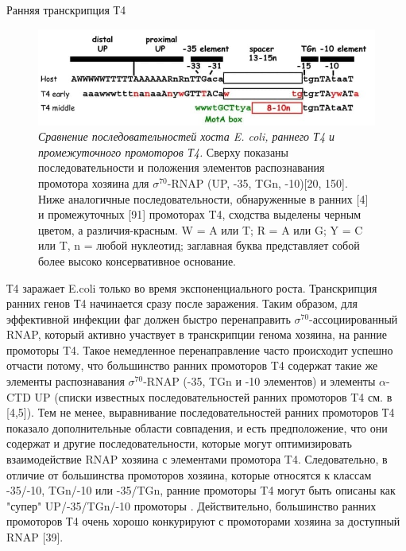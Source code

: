 \documentclass[14pt]{extarticle}
\begin{document}
        \begin{center}
            \item {\Large Ранняя транскрипция Т4}
        \end{center}
        
        \begin{figure}[h]
            \centering
                \includegraphics[width=\textwidth]{img/Hinton.jpg}
            \caption{\textit{Сравнение последовательностей хоста E. coli, раннего Т4 и промежуточного промоторов Т4.}
            Сверху показаны последовательности и положения элементов распознавания промотора хозяина для
            $\sigma^{70}$-RNAP (UP, -35, TGn, -10)[20, 150]. Ниже аналогичные последовательности, обнаруженные в ранних
            [4] и промежуточных [91] промоторах T4, сходства выделены черным цветом, а различия-красным. W = A или T; R
            = A или G; Y = C или T, n = любой нуклеотид; заглавная буква представляет собой более высоко консервативное
            основание. \cite{hinton}}
            \label{fig:skybox}
        \end{figure}

        \par{Т4 заражает E.coli только во время экспоненциального роста. Транскрипция ранних генов Т4 начинается сразу 
        после заражения. Таким образом, для эффективной инфекции фаг должен быстро перенаправить 
        \(\sigma^{70}\)-ассоциированный RNAP, который активно участвует в транскрипции генома хозяина, на ранние 
        промоторы T4. Такое немедленное перенаправление часто происходит успешно отчасти потому, что большинство ранних 
        промоторов T4 содержат такие же элементы распознавания \(\sigma^{70}\)-RNAP (-35, TGn и -10 элементов) и 
        элементы \(\alpha\)-CTD UP (списки известных последовательностей ранних промоторов T4 см. в [4,5]). Тем не
        менее, выравнивание последовательностей ранних промоторов Т4 показало дополнительные области совпадения, и есть 
        предположение, что они содержат и другие последовательности, которые могут оптимизировать взаимодействие RNAP 
        хозяина с элементами промотора T4. Следовательно, в отличие от большинства промоторов хозяина, которые относятся
        к классам -35/-10, TGn/-10 или -35/TGn, ранние промоторы T4 могут быть описаны как "супер" UP/-35/TGn/-10 
        промоторы \cite{hinton}. Действительно, большинство ранних промоторов Т4 очень хорошо конкурируют с промоторами 
        хозяина за доступный RNAP [39].}
        
\end{document}
